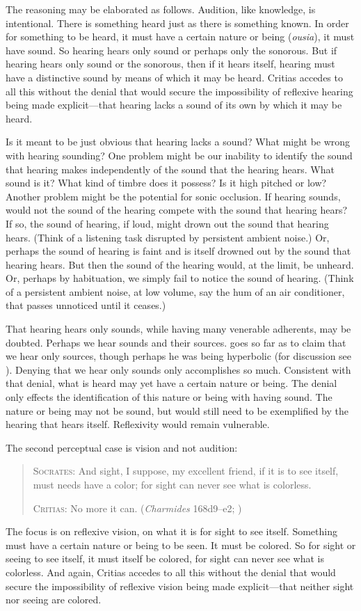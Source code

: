 The reasoning may be elaborated as follows. Audition, like knowledge, is intentional. There is something heard just as there is something known. In order for something to be heard, it must have a certain nature or being (\emph{ousia}), it must have sound. So hearing hears only sound or perhaps only the sonorous. But if hearing hears only sound or the sonorous, then if it hears itself, hearing must have a distinctive sound by means of which it may be heard. Critias accedes to all this without the denial that would secure the impossibility of reflexive hearing being made explicit—that hearing lacks a sound of its own by which it may be heard.

Is it meant to be just obvious that hearing lacks a sound? What might be wrong with hearing sounding? One problem might be our inability to identify the sound that hearing makes independently of the sound that the hearing hears. What sound is it? What kind of timbre does it possess? Is it high pitched or low? Another problem might be the potential for sonic occlusion. If hearing sounds, would not the sound of the hearing compete with the sound that hearing hears? If so, the sound of hearing, if loud, might drown out the sound that hearing hears. (Think of a listening task disrupted by persistent ambient noise.) Or, perhaps the sound of hearing is faint and is itself drowned out by the sound that hearing hears. But then the sound of the hearing would, at the limit, be unheard. Or, perhaps by habituation, we simply fail to notice the sound of hearing. (Think of a persistent ambient noise, at low volume, say the hum of an air conditioner, that passes unnoticed until it ceases.)

That hearing hears only sounds, while having many venerable adherents, may be doubted. Perhaps we hear sounds and their sources. \citet{Heidegger:1935uq} goes so far as to claim that we hear only sources, though perhaps he was being hyperbolic (for discussion see \citealt[chapters 3 and 4]{Kalderon:2018oe}). Denying that we hear only sounds only accomplishes so much. Consistent with that denial, what is heard may yet have a certain nature or being. The denial only effects the identification of this nature or being with having sound. The nature or being may not be sound, but would still need to be exemplified by the hearing that hears itself. Reflexivity would remain vulnerable.

The second perceptual case is vision and not audition:
\begin{quotation}
	\textsc{Socrates}: And sight, I suppose, my excellent friend, if it is to see itself, must needs have a color; for sight can never see what is colorless.
	
	\textsc{Critias}: No more it can. (\emph{Charmides} 168d9–e2; \citealt[63]{Lamb:1927qw})
\end{quotation}
The focus is on reflexive vision, on what it is for sight to see itself. Something must have a certain nature or being to be seen. It must be colored. So for sight or seeing to see itself, it must itself be colored, for sight can never see what is colorless. And again, Critias accedes to all this without the denial that would secure the impossibility of reflexive vision being made explicit—that neither sight nor seeing are colored.


